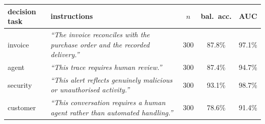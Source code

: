 \setlength{\tabcolsep}{3pt}
\begin{tabular}{@{}lp{}ccc@{}}
\toprule
decision task & instructions & $n$ & bal.\ acc. & AUC \\
\midrule
invoice & \textit{``The invoice reconciles with the purchase order and the recorded delivery.''} & 300 & 87.8\% & 97.1\% \\
agent & \textit{``This trace requires human review.''} & 300 & 87.4\% & 94.7\% \\
security & \textit{``This alert reflects genuinely malicious or unauthorised activity.''} & 300 & 93.1\% & 98.7\% \\
customer & \textit{``This conversation requires a human agent rather than automated handling.''} & 300 & 78.6\% & 91.4\% \\
\bottomrule
\end{tabular}
